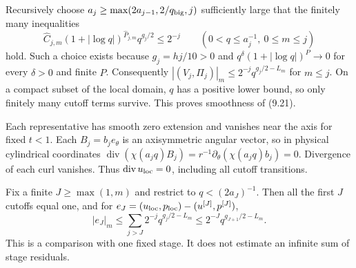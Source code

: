 \documentclass[10pt,a4paper]{article}
\begin{document}
Recursively choose $a_j\ge\max(2a_{j-1},2/q_{\rm big},j)$ sufficiently
large that the finitely many inequalities
\[
\widehat C_{j,m}(1+|\log q|)^{\widehat P_{j,m}}q^{g_j/2}
\le2^{-j}\qquad(0<q\le a_j^{-1},\ 0\le m\le j)
\]
hold. Such a choice exists because $g_j=hj/10>0$ and
$q^\delta(1+|\log q|)^P\to0$ for every $\delta>0$ and finite $P$.
Consequently
$|(V_j,\Pi_j)|_m\le2^{-j}q^{g_j/2-L_m}$ for $m\le j$.
On a compact subset of the local domain, $q$ has a positive lower
bound, so only finitely many cutoff terms survive. This proves
smoothness of (9.21).

Each representative has smooth zero extension and vanishes near the axis for
fixed $t<1$. Each $B_j=b_je_\theta$ is an axisymmetric angular vector,
so in physical cylindrical coordinates
$\operatorname{div}(\chi(a_jq)B_j)=r^{-1}\partial_\theta
(\chi(a_jq)b_j)=0$. Divergence of each curl vanishes. Thus
$\operatorname{div}u_{\rm loc}=0$, including all cutoff transitions.

Fix a finite $J\ge\max(1,m)$ and restrict to
$q<(2a_J)^{-1}$. Then all the first $J$ cutoffs equal one, and for
$e_J=(u_{\rm loc},p_{\rm loc})-(u^{[J]},p^{[J]})$,
\[
|e_J|_m\le\sum_{j>J}2^{-j}q^{g_j/2-L_m}
\le2^{-J}q^{g_{J+1}/2-L_m}.                                     \tag{9.23}
\]
This is a comparison with one fixed stage. It does not estimate an
infinite sum of stage residuals.
\end{document}
